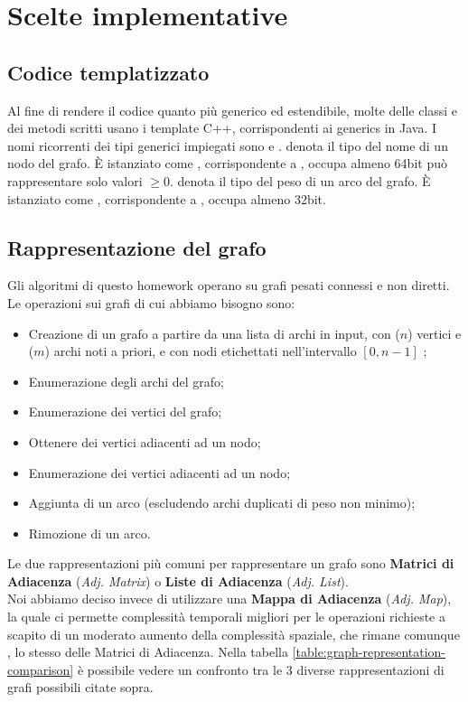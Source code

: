 \section{Scelte implementative}
\label{cap:implementation-choices}

\subsection{Codice templatizzato}

Al fine di rendere il codice quanto più generico ed estendibile, molte delle classi e dei metodi scritti
usano i template C++, corrispondenti ai generics in Java.
I nomi ricorrenti dei tipi generici impiegati sono  e .
 denota il tipo del nome di un nodo del grafo. È istanziato come , corrispondente a , occupa almeno 64bit può rappresentare solo valori $\geq 0$.
 denota il tipo del peso di un arco del grafo. È istanziato come , corrispondente a ,
occupa almeno 32bit.

\subsection{Rappresentazione del grafo}
\label{sub:graph-representation}

Gli algoritmi di questo homework operano su grafi pesati connessi e non diretti.
Le operazioni sui grafi di cui abbiamo bisogno sono:

\begin{itemize}
    \item Creazione di un grafo a partire da una lista di archi in input, con ($n$) vertici e ($m$) archi noti a priori, e con nodi etichettati nell'intervallo $ [0, n-1] $ ;
    \item Enumerazione degli archi del grafo;
    \item Enumerazione dei vertici del grafo;
    \item Ottenere dei vertici adiacenti ad un nodo;
    \item Enumerazione dei vertici adiacenti ad un nodo;
    \item Aggiunta di un arco (escludendo archi duplicati di peso non minimo);
    \item Rimozione di un arco.
\end{itemize}

\noindent Le due rappresentazioni più comuni per rappresentare un grafo sono \textbf{Matrici di Adiacenza} (\textit{Adj. Matrix}) o \textbf{Liste di Adiacenza} (\textit{Adj. List}). \\
Noi abbiamo deciso invece di utilizzare una \textbf{Mappa di Adiacenza} (\textit{Adj. Map}), la quale ci permette complessità temporali migliori per le operazioni richieste a scapito di un moderato aumento della complessità spaziale, che rimane comunque \complexityNPlusM{}, lo stesso delle Matrici di Adiacenza. Nella tabella \ref{table:graph-representation-comparison} è possibile vedere un confronto tra le 3 diverse rappresentazioni di grafi possibili citate sopra. \\


